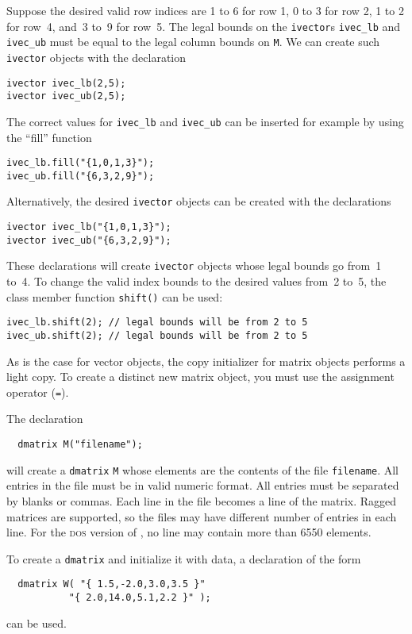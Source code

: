 \documentclass{admbmanual}
\begin{document}
Suppose the desired valid row indices are 1 to 6 for row 1, 0 to 3 for row 2, 1
to 2 for row~4, and~3 to~9 for row~5. The legal bounds on the \texttt{ivector}s
\texttt{ivec\_lb} and \texttt{ivec\_ub} must be equal to the legal column bounds
on \texttt{M}. We can create such \texttt{ivector} objects with the declaration
\begin{lstlisting}
ivector ivec_lb(2,5);
ivector ivec_ub(2,5);
\end{lstlisting}

The correct values for \texttt{ivec\_lb} and \texttt{ivec\_ub} can be inserted
for example by using the ``fill'' function
\begin{lstlisting}
ivec_lb.fill("{1,0,1,3}");
ivec_ub.fill("{6,3,2,9}");
\end{lstlisting}

Alternatively, the desired \texttt{ivector} objects can be created with the
declarations
\begin{lstlisting}
ivector ivec_lb("{1,0,1,3}");
ivector ivec_ub("{6,3,2,9}");
\end{lstlisting}

These declarations will create \texttt{ivector} objects whose legal bounds go
from~1 to~4. To change the valid index bounds to the desired values from~2 to~5,
the class member function \texttt{shift()} can be used:
\begin{lstlisting}
ivec_lb.shift(2); // legal bounds will be from 2 to 5
ivec_ub.shift(2); // legal bounds will be from 2 to 5
\end{lstlisting}

As is the case for vector objects, the copy initializer for matrix objects
performs a light copy. To create a distinct new matrix object, you must use the
assignment operator (\texttt{=}).

The declaration
\begin{lstlisting}
  dmatrix M("filename");
\end{lstlisting}
will create a \texttt{dmatrix} \texttt{M} whose elements are the contents of the
file \texttt{filename}. All entries in the file must be in valid numeric format.
All entries must be separated by blanks or commas. Each line in the file becomes
a line of the matrix. Ragged matrices are supported, so the files may have
different number of entries in each line. For the \textsc{dos} version of \scAD,
no line may contain more than 6550 elements.

To create a \texttt{dmatrix} and initialize it with data, a declaration of the
form
\begin{lstlisting}
  dmatrix W( "{ 1.5,-2.0,3.0,3.5 }"
           "{ 2.0,14.0,5.1,2.2 }" );
\end{lstlisting}
can be used.
\end{document}
